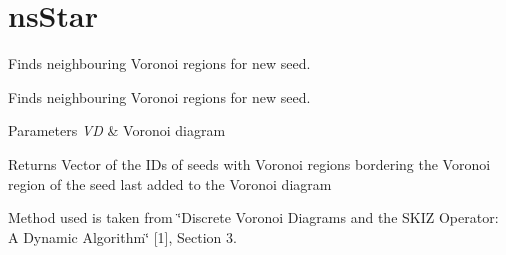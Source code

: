 \hypertarget{group__nsStar}{}\section{ns\+Star}
\label{group__nsStar}


Finds neighbouring Voronoi regions for new seed.  


Finds neighbouring Voronoi regions for new seed. 


\begin{DoxyParams}{Parameters}
{\em VD} & Voronoi diagram \\
\hline
\end{DoxyParams}
\begin{DoxyReturn}{Returns}
Vector of the I\+Ds of seeds with Voronoi regions bordering the Voronoi region of the seed last added to the Voronoi diagram
\end{DoxyReturn}
Method used is taken from \char`\"{}\+Discrete Voronoi Diagrams and the S\+K\+I\+Z
 Operator\+: A Dynamic Algorithm\char`\"{} \mbox{[}1\mbox{]}, Section 3. 